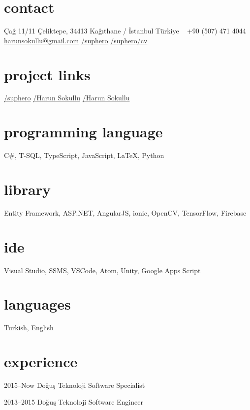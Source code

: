 \documentclass[]{../friggeri-cv} %
\begin{document}

\begin{aside}
\section{contact}
Çağ 11/11
Çeliktepe, 34413
Kağıthane / İstanbul
Türkiye
~
+90 (507) 471 4044
~
\href{mailto:harunsokullu@gmail.com}{harunsokullu@gmail.com}
\href{https://www.linkedin.com/in/suphero}{\faLinkedin/suphero}
\href{https://github.com/suphero/cv/raw/master/English/Harun\%20Sokullu.pdf}{\faGithub/suphero/cv}
\section{project links}
\href{https://github.com/suphero}{\faGithub/suphero}
\href{https://play.google.com/store/apps/developer?id=Harun+Sokullu}{\faAndroid/Harun Sokullu}
\href{https://itunes.apple.com/tr/developer/harun-sokullu/id1265151811}{\faApple/Harun Sokullu}
\section{programming language}
C\#, T-SQL, TypeScript, JavaScript, \LaTeX, Python
\section{library}
Entity Framework, ASP.NET, AngularJS, ionic, OpenCV, TensorFlow, Firebase
\section{ide}
Visual Studio, SSMS, VSCode, Atom, Unity, Google Apps Script
\section{languages}
Turkish, English
\end{aside}

\section{experience}

\begin{entrylist}

\entry
{2015--Now}
{Doğuş Teknoloji}
{}
{Software Specialist}

\entry
{2013--2015}
{Doğuş Teknoloji}
{}
{Software Engineer}

\end{entrylist}
\end{document}
